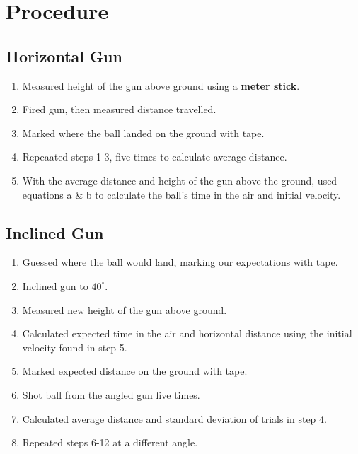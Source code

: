 
\section{Procedure}
\vspace{-0.5cm}
\singlespacing



\subsection{Horizontal Gun}

	\begin{enumerate}
		\item Measured height of the gun above ground using a \textbf{meter stick}.
		\item Fired gun, then measured distance travelled. 
		\item Marked where the ball landed on the ground with tape.
		\item Repeaated steps 1-3, five times to calculate average distance.
		\item With the average distance and height of the gun above the ground, used equations a \& b to calculate the ball's time in the air and initial velocity.
	\end{enumerate}	

\subsection{Inclined Gun}

	\begin{enumerate}[resume]
		\item Guessed where the ball would land, marking our expectations with tape.
		\item Inclined gun to  $40^\circ$.
		\item Measured new height of the gun above ground.
		\item Calculated expected time in the air and horizontal distance using the initial velocity found in step 5.
		\item Marked expected distance on the ground with tape.
		\item Shot ball from the angled gun five times.
		\item Calculated average distance and standard deviation of trials in step 4.
		\item Repeated steps 6-12 at a different angle.
	\end{enumerate}

\newpage




